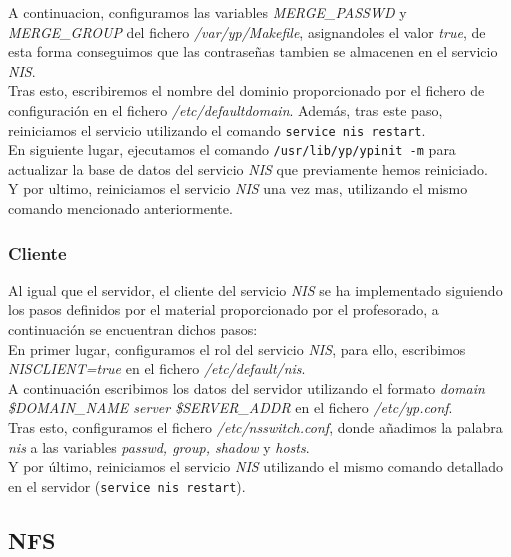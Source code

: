 \documentclass[12pt,a4paper, spanish]{article}
\begin{document}
A continuacion, configuramos las variables \textit{MERGE\_PASSWD} y \textit{MERGE\_GROUP} del fichero \textit{/var/yp/Makefile}, asignandoles el valor \textit{true}, de esta forma conseguimos que las contraseñas tambien se almacenen en el servicio \textit{NIS}.\\

Tras esto, escribiremos el nombre del dominio proporcionado por el fichero de configuración en el fichero \textit{/etc/defaultdomain}. Además, tras este paso, reiniciamos el servicio utilizando el comando \texttt{service nis restart}.\\

En siguiente lugar, ejecutamos el comando \texttt{/usr/lib/yp/ypinit -m} para actualizar la base de datos del servicio \textit{NIS} que previamente hemos reiniciado.\\

Y por ultimo, reiniciamos el servicio \textit{NIS} una vez mas, utilizando el mismo comando mencionado anteriormente.\\


\subsubsection{Cliente}
\noindent Al igual que el servidor, el cliente del servicio \textit{NIS} se ha implementado siguiendo los pasos definidos por el material proporcionado por el profesorado, a continuación se encuentran dichos pasos:\\

En primer lugar, configuramos el rol del servicio \textit{NIS}, para ello, escribimos \textit{NISCLIENT=true} en el fichero \textit{/etc/default/nis}.\\

A continuación escribimos los datos del servidor utilizando el formato \textit{domain \$DOMAIN\_NAME server \$SERVER\_ADDR} en el fichero \textit{/etc/yp.conf}.\\

Tras esto, configuramos el fichero \textit{/etc/nsswitch.conf}, donde añadimos la palabra \textit{nis} a las variables \textit{passwd, group, shadow} y \textit{hosts}.\\

Y por último, reiniciamos el servicio \textit{NIS} utilizando el mismo comando detallado en el servidor (\texttt{service nis restart}).\\

\subsection{NFS}
\end{document}
